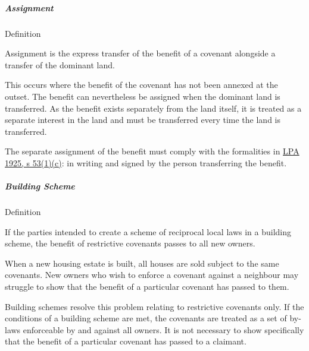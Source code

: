 \documentclass[
]{article}
\newenvironment{env-615494ee-4c11-425d-a24a-676608cc22a4}
{
    \savenotes\tcolorbox[blanker,breakable,left=5pt,borderline west={2pt}{-4pt}{gold}]
}
{
    \endtcolorbox\spewnotes
}
\begin{document}
\hypertarget{assignment}{%
\subparagraph{Assignment}\label{assignment}}

\begin{env-615494ee-4c11-425d-a24a-676608cc22a4}

Definition

Assignment is the express transfer of the benefit of a covenant
alongside a transfer of the dominant land.

\end{env-615494ee-4c11-425d-a24a-676608cc22a4}

This occurs where the benefit of the covenant has not been annexed at
the outset. The benefit can nevertheless be assigned when the dominant
land is transferred. As the benefit exists separately from the land
itself, it is treated as a separate interest in the land and must be
transferred every time the land is transferred.

The separate assignment of the benefit must comply with the formalities
in
\href{https://www.legislation.gov.uk/ukpga/Geo5/15-16/20/section/53}{LPA
1925, s 53(1)(c)}: in writing and signed by the person transferring the
benefit.

\hypertarget{building-scheme}{%
\subparagraph{Building Scheme}\label{building-scheme}}

\begin{env-615494ee-4c11-425d-a24a-676608cc22a4}

Definition

If the parties intended to create a scheme of reciprocal local laws in a
building scheme, the benefit of restrictive covenants passes to all new
owners.

\end{env-615494ee-4c11-425d-a24a-676608cc22a4}

When a new housing estate is built, all houses are sold subject to the
same covenants. New owners who wish to enforce a covenant against a
neighbour may struggle to show that the benefit of a particular covenant
has passed to them.

Building schemes resolve this problem relating to restrictive covenants
only. If the conditions of a building scheme are met, the covenants are
treated as a set of by-laws enforceable by and against all owners. It is
not necessary to show specifically that the benefit of a particular
covenant has passed to a claimant.
\end{document}
